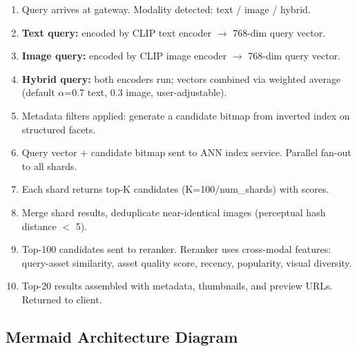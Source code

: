 \begin{enumerate}
  \item Query arrives at gateway. Modality detected: text / image / hybrid.
  \item \textbf{Text query:} encoded by CLIP text encoder $\rightarrow$ 768-dim query vector.
  \item \textbf{Image query:} encoded by CLIP image encoder $\rightarrow$ 768-dim query vector.
  \item \textbf{Hybrid query:} both encoders run; vectors combined via weighted average (default $\alpha$=0.7 text, 0.3 image, user-adjustable).
  \item Metadata filters applied: generate a candidate bitmap from inverted index on structured facets.
  \item Query vector + candidate bitmap sent to ANN index service. Parallel fan-out to all shards.
  \item Each shard returns top-K candidates (K=100/num\_shards) with scores.
  \item Merge shard results, deduplicate near-identical images (perceptual hash distance $<$ 5).
  \item Top-100 candidates sent to reranker. Reranker uses cross-modal features: query-asset similarity, asset quality score, recency, popularity, visual diversity.
  \item Top-20 results assembled with metadata, thumbnails, and preview URLs. Returned to client.
\end{enumerate}

\subsection*{Mermaid Architecture Diagram}

